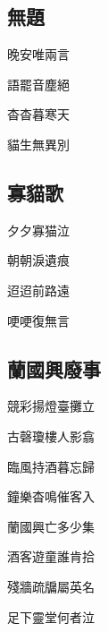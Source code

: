 \documentclass[a4j,12pt]{ltjtarticle}
\begin{document}
\begin{center}
	\newpage


	\begin{flushleft}
		\section{無題} 
	\end{flushleft}	


	\vfill
	\LARGE 晚安唯兩言\par
	語罷音塵絕\par
	杳杳暮寒天\par
	貓生無異別\par
	\vspace{1.5cm} %
	\vfill

	\newpage

	\begin{flushleft}
		\section{寡貓歌} 
	\end{flushleft}	


	\vfill
	\LARGE 夕夕寡猫泣\par
	朝朝淚遺痕\par
	迢迢前路遠\par
	哽哽復無言\par
	\vspace{1.5cm} %
	\vfill

	\newpage

	\begin{flushleft}
		\section{蘭國興廢事} 
	\end{flushleft}	

	\vfill
	\LARGE 競彩揚燈臺攤立\par
	古磬瓊樓人影翕\par
	臨風持酒暮忘歸\par
	鐘樂杳鳴催客入\par
	蘭國興亡多少集\par
	酒客遊童誰肯拾\par
	殘牆疏牖屬英名\par
	足下靈堂何者泣\par
	\vspace{1.5cm} %
	\vfill

	\newpage
	

\end{center}
\end{document}
